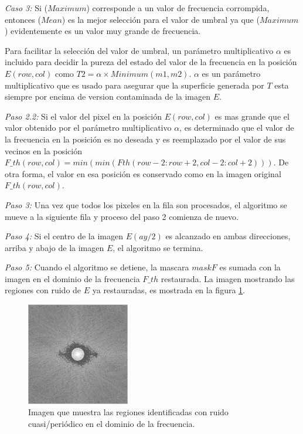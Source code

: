 \documentclass[10pt,letterpaper]{article}
\begin{document}
\textit{Caso 3:} Si ($Maximum$) corresponde a un valor de frecuencia corrompida, entonces ($Mean$) es la mejor selección para el valor de umbral ya que ($Maximum$) evidentemente es un valor muy grande de frecuencia.

Para facilitar la selección del valor de umbral, un parámetro multiplicativo $\alpha$ es incluido para decidir la pureza del estado del valor de la frecuencia en la posición $E(row, col)$ como $T2 = \alpha \times Minimum(m1 ,m2)$. $\alpha$ es un parámetro multiplicativo que es usado para asegurar que la superficie generada por $T$ esta siempre por encima de version contaminada de la imagen $E$.

\textit{Paso 2.2:} Si el valor del pixel en la posición $E(row, col)$ es mas grande que el valor obtenido por el parámetro multiplicativo $\alpha$, es determinado que el valor de la frecuencia en la posición es no deseada y es reemplazado por el valor de sus vecinos en la posición $F\_th(row, col) =
min(min(F th(row - 2 : row + 2, col - 2 : col + 2)))$. De otra forma, el valor en esa posición es conservado como en la imagen original $F\_th(row, col)$.

\textit{Paso 3:} Una vez que todos los pixeles en la fila son procesados, el algoritmo se mueve a la siguiente fila y proceso del paso 2 comienza de nuevo.

\textit{Paso 4:} Si el centro de la imagen $E(ay/2)$ es alcanzado en ambas direcciones, arriba y abajo de la imagen $E$, el algoritmo se termina.

\textit{Paso 5:} Cuando el algoritmo se detiene, la mascara $maskF$ es sumada con la imagen en el dominio de la frecuencia $F\_th$ restaurada. La imagen mostrando las regiones con ruido de $E$ ya restauradas, es mostrada en la figura \ref{tif19}. 

\begin{figure}[H]
	\centering
    \includegraphics[width=0.4\textwidth]{tifs/tif19.png}
    \caption{Imagen que muestra las regiones identificadas con ruido cuasi/periódico en el dominio de la frecuencia.}
    \label{tif19}
\end{figure}
\end{document}

